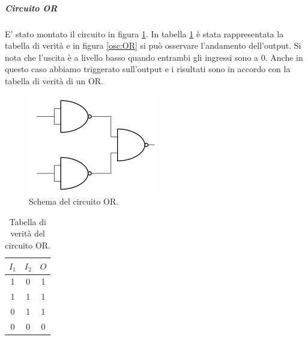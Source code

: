 \documentclass[10pt,a4paper]{article}
\begin{document}
\subparagraph{Circuito OR}

E' stato montato il circuito in figura \ref{fig:OR}. In tabella \ref{tab:OR} è stata rappresentata la tabella di verità e in figura \ref{osc:OR} si può osservare l'andamento dell'output. Si nota che l'uscita è a livello basso quando entrambi gli ingressi sono a 0. Anche in questo caso abbiamo triggerato sull'output e i risultati sono in accordo con la tabella di verità di un OR.

\begin{figure}[!htb]
  \centering
  \includegraphics[scale=0.5]{or.png}
\caption{Schema del circuito OR.\label{fig:OR}}
\end{figure}

\begin{table}[!htb]
\begin{tabular}{|c|c|c|}
\hline 
$I_1$ & $I_2$ & $O$ \\
\hline
 1 &  0 & 1\\ 

 1 &  1 & 1\\ 
 
 0 &  1 & 1\\ 
 
 0 &  0 & 0\\ 
\hline 
\end{tabular} 
\caption{Tabella di verità del circuito OR.\label{tab:OR}}
\end{table}
\end{document}
